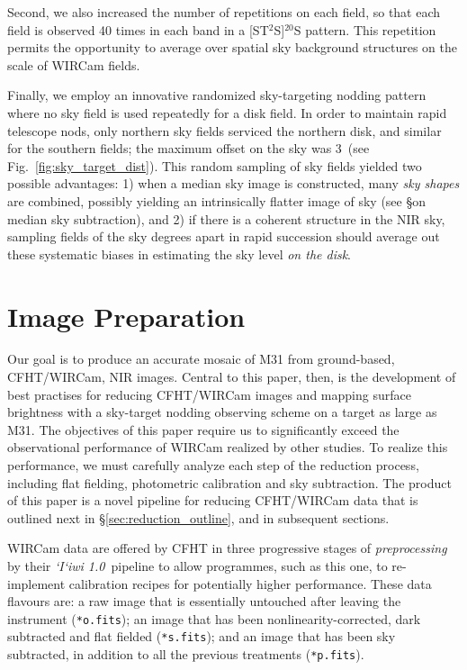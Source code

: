 \documentclass[iop]{emulateapj}
\newcommand{\sw}[1]{\textit{#1}} %
\newcommand{\iiwione}{\sw{`I`iwi 1.0}}
\newcommand{\androids}{\textsc{androids}}
\newcommand{\Fig}[1]{Fig.~\ref{fig:#1}}  %
\begin{document}
Second, we also increased the number of repetitions on each field, so that each field is observed 40 times in each band in a [ST$^2$S]$^{20}$S pattern. This repetition permits the opportunity to average over spatial sky background structures on the scale of WIRCam fields.

Finally, we employ an innovative randomized sky-targeting nodding pattern where no sky field is used repeatedly for a disk field. In order to maintain rapid telescope nods, only northern sky fields serviced the northern disk, and similar for the southern fields; the maximum offset on the sky was 3\arcdeg\ (see \Fig{sky_target_dist}). This random sampling of sky fields yielded two possible advantages: 1) when a median sky image is constructed, many \emph{sky shapes} are combined, possibly yielding an intrinsically flatter image of sky (see \S on median sky subtraction), and 2) if there is a coherent structure in the NIR sky, sampling fields of the sky degrees apart in rapid succession should average out these systematic biases in estimating the sky level \emph{on the disk}.


\section{Image Preparation}
\label{sec:reduction}

Our goal is to produce an accurate mosaic of M31 from ground-based, CFHT/WIRCam, NIR images.
Central to this paper, then, is the development of best practises for reducing CFHT/WIRCam images and mapping surface brightness with a sky-target nodding observing scheme on a target as large as M31.
The objectives of this paper require us to significantly exceed the observational performance of WIRCam realized by other studies.
To realize this performance, we must carefully analyze each step of the reduction process, including flat fielding, photometric calibration and sky subtraction.
The product of this paper is a novel pipeline for reducing CFHT/WIRCam data that is outlined next in \S\ref{sec:reduction_outline}, and in subsequent sections.

WIRCam data are offered by CFHT in three progressive stages of \emph{preprocessing} by their \iiwione\ pipeline to allow programmes, such as this one, to re-implement calibration recipes for potentially higher performance.
These data flavours are: a raw image that is essentially untouched after leaving the instrument (\texttt{*o.fits}); an image that has been nonlinearity-corrected, dark subtracted and flat fielded (\texttt{*s.fits}); and an image that has been sky subtracted, in addition to all the previous treatments (\texttt{*p.fits}).
\end{document}
